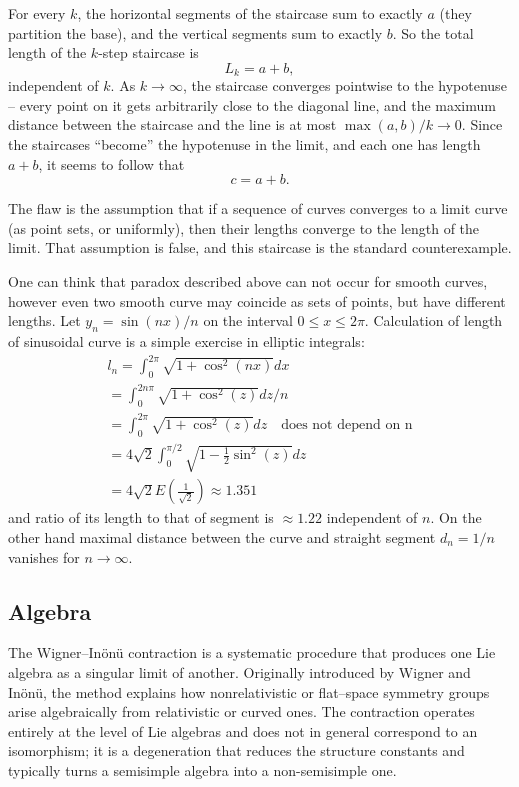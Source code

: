 For every $k$, the horizontal segments of the staircase sum to exactly $a$
(they partition the base), and the vertical segments sum to exactly $b$.
So the total length of the $k$-step staircase is
$$L_k = a + b,$$
independent of $k$. As $k\to\infty$, the staircase converges pointwise to the
hypotenuse -- every point on it gets arbitrarily close to the diagonal line,
and the maximum distance between the staircase and the line is at most
$\max(a,b)/k \to 0$. Since the staircases ``become'' the hypotenuse in the
limit, and each one has length $a+b$, it seems to follow that
$$c = a+b.$$

The flaw is the assumption that if a sequence of curves converges to a limit
curve (as point sets, or uniformly), then their lengths converge to the
length of the limit. That assumption is false, and this staircase is the
standard counterexample.

One can think that paradox described above can
not occur for smooth curves, however even two smooth curve may coincide as sets of 
points, but have different lengths. Let $ y_n= \sin(n x)/n $ on the  
interval $ 0\le x \le 2 \pi $. Calculation of length of sinusoidal curve 
is a simple exercise in elliptic integrals:
\begin{equation}
   \label {sin-length}
   \begin{split}
       l_n=\int_0^{2 \pi}\sqrt{1+\cos^2(nx)}dx\\
       =\int_0^{2 n \pi}\sqrt{1+\cos^2(z)}dz/n\\
       =\int_0^{2 \pi}\sqrt{1+\cos^2(z)}dz\quad \text{does not depend on n}  \\
       =4 \sqrt{2} \int_0^{\pi/2}\sqrt{1-\frac{1}{2} \sin^2(z)}dz\\
       =4 \sqrt{2} E(\frac{1}{\sqrt{2}}) \approx 1.351
   \end{split}
\end{equation}  
and ratio of its length to that of segment is $ \approx 1.22 $ independent of $
n $. On the other hand maximal distance between the curve and straight segment
$ d_n=1/n $ vanishes for $ n\rightarrow \infty $.

\subsection{Algebra}

The Wigner--In\"on\"u contraction is a systematic procedure that produces one Lie
algebra as a singular limit of another.  Originally introduced by Wigner and
In\"on\"u, the method explains how nonrelativistic or
flat--space symmetry groups arise algebraically from relativistic or curved
ones.  The contraction operates entirely at the level of Lie algebras and does
not in general correspond to an isomorphism; it is a degeneration that reduces
the structure constants and typically turns a semisimple algebra into a
non-semisimple one.

